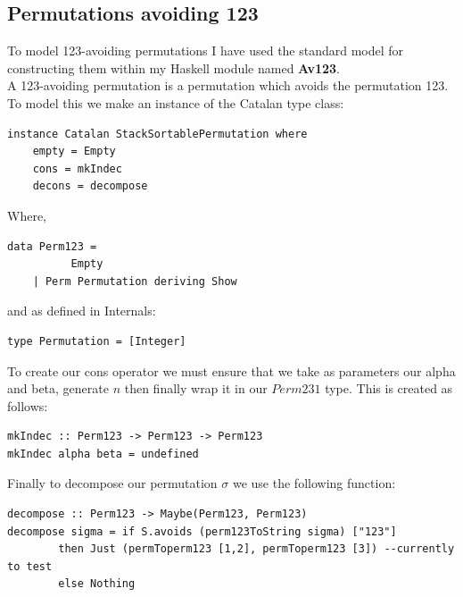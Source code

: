 \documentclass[12pt]{article}
\begin{document}
\subsection {Permutations avoiding 123}
To model 123-avoiding permutations I have used the standard model for constructing them within my Haskell module named {\bf Av123}.\\
A 123-avoiding permutation is a permutation which avoids the permutation 123.  To model this we make an instance of the Catalan type class:
\begin{lstlisting}
instance Catalan StackSortablePermutation where
	empty = Empty	
	cons = mkIndec
	decons = decompose
\end{lstlisting}
Where, 
\begin{lstlisting}
data Perm123 = 
          Empty 
	| Perm Permutation deriving Show
\end{lstlisting}
and as defined in Internals:
\begin{lstlisting}
type Permutation = [Integer]
\end{lstlisting}

To create our cons operator we must ensure that we take as parameters our alpha and beta, generate $n$ then finally wrap it in our $Perm231$ type. This is created as follows:
\begin{lstlisting}
mkIndec :: Perm123 -> Perm123 -> Perm123
mkIndec alpha beta = undefined
\end{lstlisting}
Finally to decompose our permutation $\sigma$ we use the following function:
\begin{lstlisting}
decompose :: Perm123 -> Maybe(Perm123, Perm123)
decompose sigma = if S.avoids (perm123ToString sigma) ["123"]
		then Just (permToperm123 [1,2], permToperm123 [3]) --currently to test
		else Nothing
\end{lstlisting}
\end{document}

